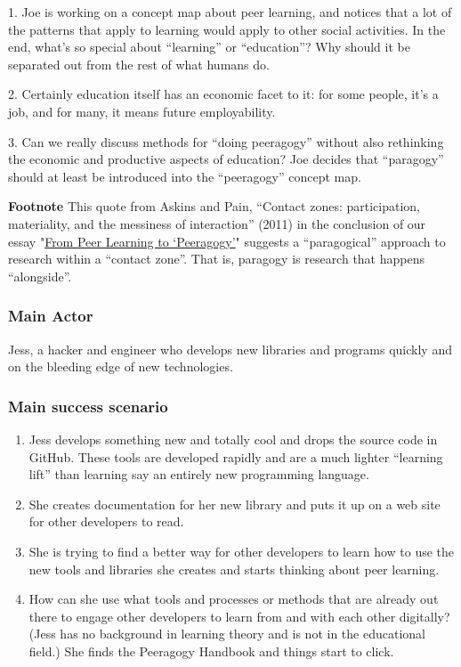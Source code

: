 1. Joe is working on a concept map about peer learning, and notices that
a lot of the patterns that apply to learning would apply to other social
activities. In the end, what's so special about ``learning'' or
``education''? Why should it be separated out from the rest of what
humans do.

2. Certainly education itself has an economic facet to it: for some
people, it's a job, and for many, it means future employability.

3. Can we really discuss methods for ``doing peeragogy'' without also
rethinking the economic and productive aspects of education? Joe decides
that ``paragogy'' should at least be introduced into the ``peeragogy''
concept map.

\textbf{Footnote} This quote from Askins and Pain, ``Contact zones:
participation, materiality, and the messiness of interaction'' (2011) in
the conclusion of our essay
"\href{http://peeragogy.org/to-peeragogy/}{From Peer Learning to
`Peeragogy'}" suggests a ``paragogical'' approach to research within a
``contact zone''. That is, paragogy is research that happens
``alongside''.

\subsubsection{Main Actor}

Jess, a hacker and engineer who develops new libraries and programs
quickly and on the bleeding edge of new technologies.

\subsubsection{Main success scenario}

\begin{enumerate}
\item
  Jess develops something new and totally cool and drops the source code
  in GitHub. These tools are developed rapidly and are a much lighter
  ``learning lift'' than learning say an entirely new programming
  language.
\item
  She creates documentation for her new library and puts it up on a web
  site for other developers to read.
\item
  She is trying to find a better way for other developers to learn how
  to use the new tools and libraries she creates and starts thinking
  about peer learning.
\item
  How can she use what tools and processes or methods that are already
  out there to engage other developers to learn from and with each other
  digitally? (Jess has no background in learning theory and is not in
  the educational field.) She finds the Peeragogy Handbook and things
  start to click.
\end{enumerate}
